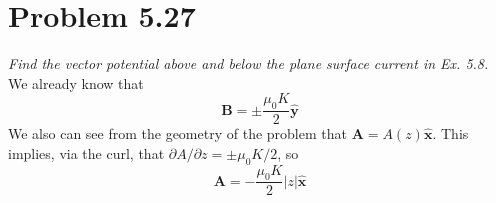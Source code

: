 \documentclass[10pt]{article}
\begin{document}
\section{Problem 5.27}

\textit{Find the vector potential above and below the plane surface current in Ex. 5.8.}
\noindent
We already know that
\begin{equation}
\mathbf{B} = \pm \frac{\mu_0 K}{2}\hat{\mathbf{y}}
\end{equation}
\noindent
We also can see from the geometry of the problem that $\mathbf{A} = A(z)\hat{\mathbf{x}}$.  This implies, via the curl, that $\partial A/\partial z = \pm \mu_0 K/2$, so
\begin{equation}
\mathbf{A} = - \frac{\mu_0 K}{2}|z| \hat{\mathbf{x}}
\end{equation}
\end{document}
